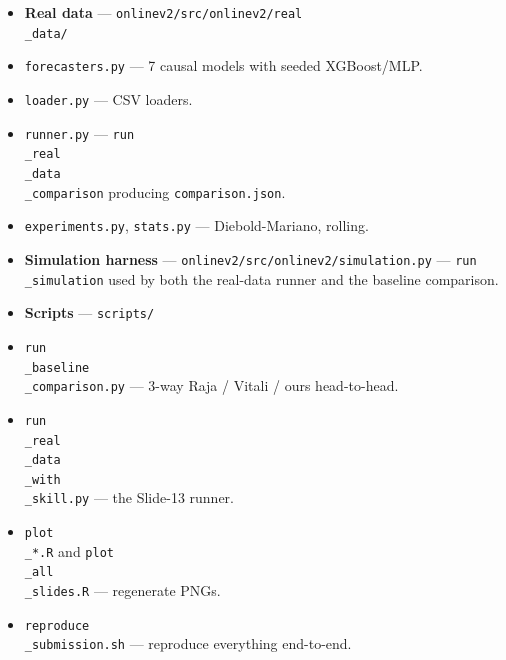 \documentclass[11pt]{article}
\begin{document}
\begin{itemize}
\item \textbf{Real data} --- \texttt{onlinev2/src/onlinev2/real\\_data/}
\item \texttt{forecasters.py} --- 7 causal models with seeded XGBoost/MLP.
\item \texttt{loader.py} --- CSV loaders.
\item \texttt{runner.py} --- \texttt{run\\_real\\_data\\_comparison} producing \texttt{comparison.json}.
\item \texttt{experiments.py}, \texttt{stats.py} --- Diebold-Mariano, rolling.
\end{itemize}

\begin{itemize}
\item \textbf{Simulation harness} --- \texttt{onlinev2/src/onlinev2/simulation.py} --- \texttt{run\\_simulation} used by both the real-data runner and the baseline comparison.
\end{itemize}

\begin{itemize}
\item \textbf{Scripts} --- \texttt{scripts/}
\item \texttt{run\\_baseline\\_comparison.py} --- 3-way Raja / Vitali / ours head-to-head.
\item \texttt{run\\_real\\_data\\_with\\_skill.py} --- the Slide-13 runner.
\item \texttt{plot\\_*.R} and \texttt{plot\\_all\\_slides.R} --- regenerate PNGs.
\item \texttt{reproduce\\_submission.sh} --- reproduce everything end-to-end.
\end{itemize}
\end{document}
